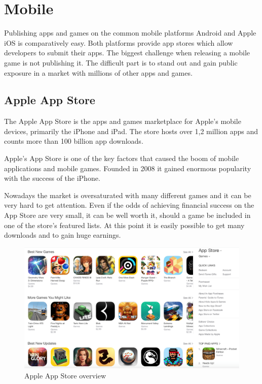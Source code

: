 \section{Mobile}
\label{sec:mobile}
Publishing apps and games on the common mobile platforms Android and Apple iOS is comparatively easy. Both platforms provide app stores which allow developers to submit their apps. 
The biggest challenge when releasing a mobile game is not publishing it. The difficult part is to stand out and gain public exposure in a market with millions of other apps and games.

\subsection{Apple App Store}
\label{subsec:apple_app_store}
The Apple App Store is the apps and games marketplace for Apple's mobile devices, primarily the iPhone and iPad. The store hosts over 1,2 million apps \citep{ranger_ios_2015} and counts more than 100 billion app downloads. \citep{ingraham_apples_2015} 

Apple's App Store is one of the key factors that caused the boom of mobile applications and mobile games. Founded in 2008 it gained enormous popularity with the success of the iPhone. 

Nowadays the market is oversaturated with many different games and it can be very hard to get attention. Even if the odds of achieving financial success on the App Store are very small, it can be well worth it, should a game be included in one of the store's featured lists. At this point it is easily possible to get many downloads and to gain huge earnings. 

\begin{figure}[!hbp]
\includegraphics[width=\linewidth]{img/apple.png}
\centering
\caption{ Apple App Store overview}
\label{fig:apple}
\end{figure}

